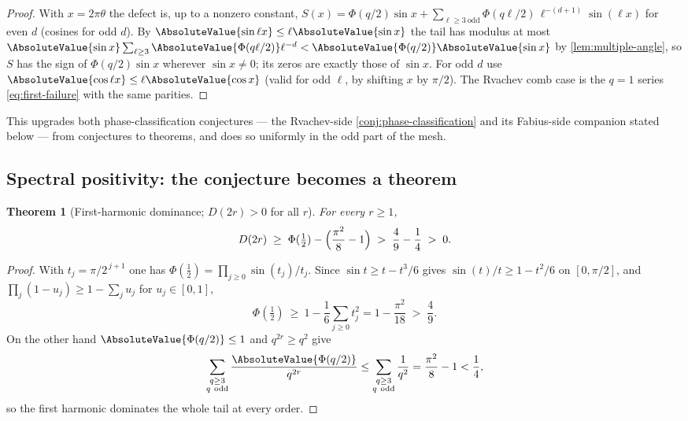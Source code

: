 \documentclass[11pt,oneside]{article}
\numberwithin{equation}{section}
\newtheorem{theorem}{Theorem}[section]
\theoremstyle{definition}
\theoremstyle{remark}
\begin{document}
\begin{proof}
With $x=2\pi\theta$ the defect is, up to a nonzero constant,
$S(x)=\Phi(q/2)\sin x+\sum_{\ell\ge3\ \mathrm{odd}}
\Phi(q\ell/2)\,\ell^{-(d+1)}\sin(\ell x)$ for even $d$ (cosines for
odd $d$).  By $\AbsoluteValue{\sin\ell x}\le\ell\AbsoluteValue{\sin x}$ the tail has
modulus at most
$\AbsoluteValue{\sin x}\sum_{\ell\ge3}\AbsoluteValue{\Phi(q\ell/2)}\ell^{-d}
<\AbsoluteValue{\Phi(q/2)}\AbsoluteValue{\sin x}$ by
\cref{lem:multiple-angle}, so $S$ has the sign of
$\Phi(q/2)\sin x$ wherever $\sin x\ne0$; its zeros are exactly those
of $\sin x$.  For odd $d$ use $\AbsoluteValue{\cos\ell x}\le\ell\AbsoluteValue{\cos x}$
(valid for odd $\ell$, by shifting $x$ by $\pi/2$).  The Rvachev comb
case is the $q=1$ series \eqref{eq:first-failure} with the same
parities.
\end{proof}

This upgrades both phase-classification conjectures --- the
Rvachev-side \cref{conj:phase-classification} and its Fabius-side
companion stated below --- from conjectures to theorems, and does so
uniformly in the odd part of the mesh.

\subsection{Spectral positivity: the conjecture becomes a theorem}

\begin{theorem}[First-harmonic dominance; $D(2r)>0$ for all $r$]
\label{thm:D-positive}
For every $r\ge1$,
\begin{equation}
 D(2r)\;\ge\;\Phi(\tfrac12)-\Bigl(\frac{\pi^{2}}8-1\Bigr)
 \;>\;\frac49-\frac14\;>\;0.
 \label{eq:D-positive}
\end{equation}
\end{theorem}

\begin{proof}
With $t_j=\pi/2^{\,j+1}$ one has
$\Phi(\tfrac12)=\prod_{j\ge0}\sin(t_j)/t_j$.  Since
$\sin t\ge t-t^{3}/6$ gives $\sin(t)/t\ge1-t^{2}/6$ on
$[0,\pi/2]$, and $\prod_j(1-u_j)\ge1-\sum_ju_j$ for
$u_j\in[0,1]$,
\[
 \Phi(\tfrac12)\ \ge\ 1-\frac16\sum_{j\ge0}t_j^{2}
 =1-\frac{\pi^{2}}{18}
 \;>\;\frac49.
\]
On the other hand $\AbsoluteValue{\Phi(q/2)}\le1$ and $q^{2r}\ge q^{2}$ give
\[
 \sum_{\substack{q\ge3\\q\ \mathrm{odd}}}
 \frac{\AbsoluteValue{\Phi(q/2)}}{q^{2r}}
 \le\sum_{\substack{q\ge3\\q\ \mathrm{odd}}}\frac1{q^{2}}
 =\frac{\pi^{2}}8-1<\frac14 ,
\]
so the first harmonic dominates the whole tail at every order.
\end{proof}
\end{document}
